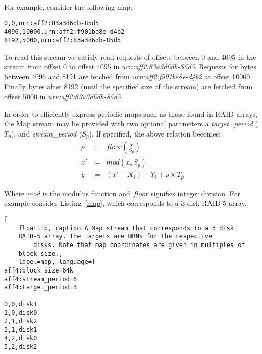 \documentclass[10pt, conference]{IEEEtran}
\begin{document}
For example, consider the following map:
\begin{lstlisting}
0,0,urn:aff2:83a3d6db-85d5
4096,10000,urn:aff2:f901be8e-d4b2
8192,5000,urn:aff2:83a3d6db-85d5
\end{lstlisting}

To read this stream we satisfy read requests of offsets between 0 and
4095 in the stream from offset 0 to offset 4095 in
\emph{urn:aff2:83a3d6db-85d5}. Requests for bytes between 4096 and 8191 are
fetched from \emph{urn:aff2:f901be8e-d4b2} at offset 10000. Finally
bytes after 8192 (until the specified size of the stream) are fetched
from offset 5000 in \emph{urn:aff2:83a3d6db-85d5}.

In order to efficiently express periodic maps such as those found in
RAID arrays, the Map stream may be provided with two optional
parameters a {\em target\_period} ($T_p$), and {\em stream\_period}
($S_p$). If specified, the above relation becomes:
\begin{eqnarray*}
p &:=& floor\left (\frac{x}{S_p} \right) \\
x' &:=& mod(x ,S_p)  \\   \label{eq:no1}
y &:=& (x'-X_i) + Y_i + p \times T_p
\end{eqnarray*}

Where $mod$ is the modulus function and $floor$ signifies integer
division. For example consider Listing~\ref{map}, which corresponds to a 3
disk RAID-5 array.

\begin{lstlisting}[
	float=tb, caption=A Map stream that corresponds to a 3 disk
	RAID-5 array. The targets are URNs for the respective
        disks. Note that map coordinates are given in multiples of 
	block size.,
	label=map, language=]
aff4:block_size=64k 
aff4:stream_period=6 
aff4:target_period=3

0,0,disk1
1,0,disk0
2,1,disk2
3,1,disk1
4,2,disk0
5,2,disk2
\end{lstlisting}


\end{document}
